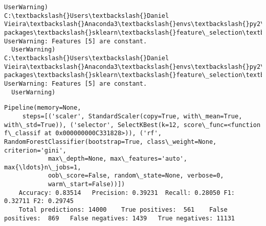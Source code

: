 \documentclass[11pt]{article}
\begin{document}
\begin{Verbatim}[commandchars=\\\{\}]
  UserWarning)
C:\textbackslash{}Users\textbackslash{}Daniel Vieira\textbackslash{}Anaconda3\textbackslash{}envs\textbackslash{}py2\textbackslash{}lib\textbackslash{}site-packages\textbackslash{}sklearn\textbackslash{}feature\_selection\textbackslash{}univariate\_selection.py:113: UserWarning: Features [5] are constant.
  UserWarning)
C:\textbackslash{}Users\textbackslash{}Daniel Vieira\textbackslash{}Anaconda3\textbackslash{}envs\textbackslash{}py2\textbackslash{}lib\textbackslash{}site-packages\textbackslash{}sklearn\textbackslash{}feature\_selection\textbackslash{}univariate\_selection.py:113: UserWarning: Features [5] are constant.
  UserWarning)

    \end{Verbatim}

    \begin{Verbatim}[commandchars=\\\{\}]
Pipeline(memory=None,
     steps=[('scaler', StandardScaler(copy=True, with\_mean=True, with\_std=True)), ('selector', SelectKBest(k=12, score\_func=<function f\_classif at 0x000000000C331828>)), ('rf', RandomForestClassifier(bootstrap=True, class\_weight=None, criterion='gini',
            max\_depth=None, max\_features='auto', max{\ldots}n\_jobs=1,
            oob\_score=False, random\_state=None, verbose=0,
            warm\_start=False))])
	Accuracy: 0.83514	Precision: 0.39231	Recall: 0.28050	F1: 0.32711	F2: 0.29745
	Total predictions: 14000	True positives:  561	False positives:  869	False negatives: 1439	True negatives: 11131


    \end{Verbatim}
\end{document}
